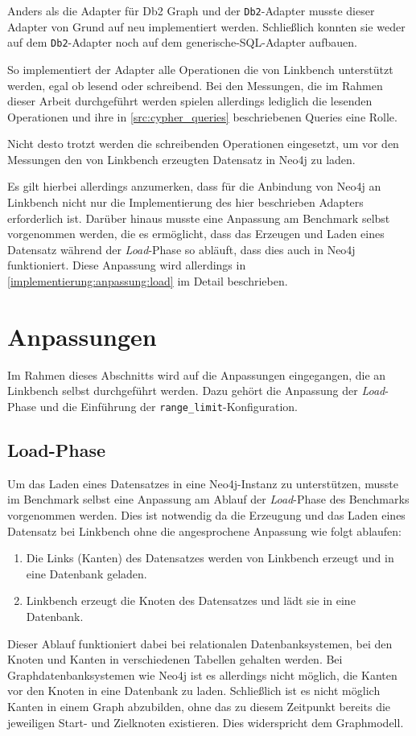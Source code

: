 Anders als die Adapter für Db2 Graph und der \texttt{Db2}-Adapter musste dieser Adapter von Grund auf neu implementiert werden. Schließlich konnten sie weder auf dem \texttt{Db2}-Adapter noch auf dem generische-SQL-Adapter aufbauen. 

So implementiert der Adapter alle Operationen die von Linkbench unterstützt werden, egal ob lesend oder schreibend. Bei den Messungen, die im Rahmen dieser Arbeit durchgeführt werden spielen allerdings lediglich die lesenden Operationen und ihre in \autoref{src:cypher_queries} beschriebenen Queries eine Rolle.

Nicht desto trotzt werden die schreibenden Operationen eingesetzt, um vor den Messungen den von Linkbench erzeugten Datensatz in Neo4j zu laden.

Es gilt hierbei allerdings anzumerken, dass für die Anbindung von Neo4j an Linkbench nicht nur die Implementierung des hier beschrieben Adapters erforderlich ist. Darüber hinaus musste eine Anpassung am Benchmark selbst vorgenommen werden, die es ermöglicht, dass das Erzeugen und Laden eines Datensatz während der \textit{Load}-Phase so abläuft, dass dies auch in Neo4j funktioniert. Diese Anpassung wird allerdings in \autoref{implementierung:anpassung:load} im Detail beschrieben.

\section{Anpassungen}
\label{implementierung:anpassung}
Im Rahmen dieses Abschnitts wird auf die Anpassungen eingegangen, die an Linkbench selbst durchgeführt werden. Dazu gehört die Anpassung der \textit{Load}-Phase und die Einführung der \texttt{range\_limit}-Konfiguration.

\subsection{Load-Phase}
\label{implementierung:anpassung:load}
Um das Laden eines Datensatzes in eine Neo4j-Instanz zu unterstützen, musste im  Benchmark selbst eine Anpassung am Ablauf der \textit{Load}-Phase des Benchmarks vorgenommen werden. Dies ist notwendig da die Erzeugung und das Laden eines Datensatz bei Linkbench ohne die angesprochene Anpassung wie folgt ablaufen:
\begin{enumerate}
    \item Die Links (Kanten) des Datensatzes werden von Linkbench erzeugt und in eine Datenbank geladen. 
    \item Linkbench erzeugt die Knoten des Datensatzes und lädt sie in eine Datenbank. 
\end{enumerate}
Dieser Ablauf funktioniert dabei bei relationalen Datenbanksystemen, bei den Knoten und Kanten in verschiedenen Tabellen gehalten werden. Bei Graphdatenbanksystemen wie Neo4j ist es allerdings nicht möglich, die Kanten vor den Knoten in eine Datenbank zu laden. Schließlich ist es nicht möglich Kanten in einem Graph abzubilden, ohne das zu diesem Zeitpunkt bereits die jeweiligen Start- und Zielknoten existieren. Dies widerspricht dem Graphmodell.

